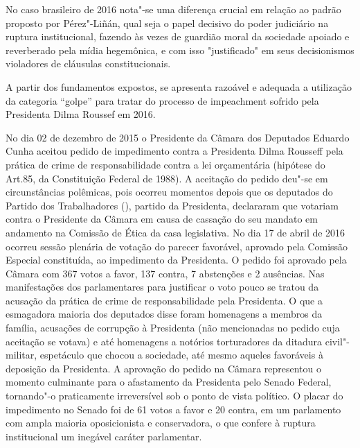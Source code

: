 No caso brasileiro de 2016 nota"-se uma diferença crucial em relação ao
padrão proposto por Pérez"-Liñán, qual seja o papel decisivo do poder
judiciário na ruptura institucional, fazendo às vezes de guardião moral
da sociedade apoiado e reverberado pela mídia hegemônica, e com isso
"justificado" em seus decisionismos violadores de cláusulas
constitucionais.

A partir dos fundamentos expostos, se apresenta razoável e adequada a
utilização da categoria ``golpe'' para tratar do processo de impeachment
sofrido pela Presidenta Dilma Roussef em 2016.

No dia 02 de dezembro de 2015 o Presidente da Câmara dos Deputados
Eduardo Cunha aceitou pedido de impedimento contra a Presidenta Dilma
Rousseff pela prática de crime de responsabilidade contra a lei
orçamentária (hipótese do Art.85,  da Constituição Federal de 1988). A
aceitação do pedido deu"-se em circunstâncias polêmicas, pois ocorreu
momentos depois que os deputados do Partido dos Trabalhadores (),
partido da Presidenta, declararam que votariam contra o Presidente da
Câmara em causa de cassação do seu mandato em andamento na Comissão de
Ética da casa legislativa. No dia 17 de abril de 2016 ocorreu sessão
plenária de votação do parecer favorável, aprovado pela Comissão
Especial constituída, ao impedimento da Presidenta. O pedido foi
aprovado pela Câmara com 367 votos a favor, 137 contra, 7 abstenções e 2
ausências. Nas manifestações dos parlamentares para justificar o voto
pouco se tratou da acusação da prática de crime de responsabilidade pela
Presidenta. O que a esmagadora maioria dos deputados disse foram
homenagens a membros da família, acusações de corrupção à Presidenta
(não mencionadas no pedido cuja aceitação se votava) e até homenagens a
notórios torturadores da ditadura civil"-militar, espetáculo que chocou a
sociedade, até mesmo aqueles favoráveis à deposição da Presidenta. A
aprovação do pedido na Câmara representou o momento culminante para o
afastamento da Presidenta pelo Senado Federal, tornando"-o praticamente
irreversível sob o ponto de vista político. O placar do impedimento no
Senado foi de 61 votos a favor e 20 contra, em um parlamento com ampla
maioria oposicionista e conservadora, o que confere à ruptura
institucional um inegável caráter parlamentar.

